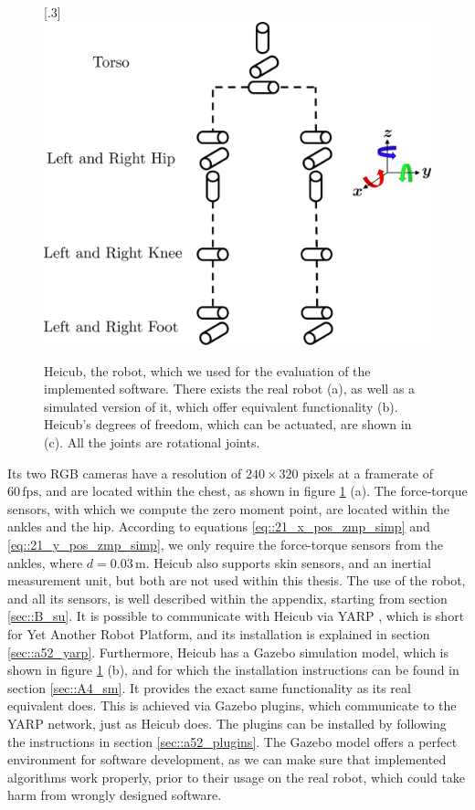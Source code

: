 \begin{figure}[h!]
	[.3\linewidth]{\includegraphics[scale=.35]{chapters/05_heicub_our_humanoid_robot/img/kinematic_tree.png}}
	\caption{Heicub, the robot, which we used for the evaluation of the implemented software. There exists the real robot (a), as well as a simulated version of it, which offer equivalent functionality (b). Heicub's degrees of freedom, which can be actuated, are shown in (c). All the joints are rotational joints.}
	\label{fig::4_hei}
\end{figure}
Its two RGB cameras have a resolution of $240\times320$ pixels at a framerate of $60\,\text{fps}$, and are located within the chest, as shown in figure \ref{fig::4_hei} (a). The force-torque sensors, with which we compute the zero moment point, are located within the ankles and the hip. According to equations \ref{eq::21_x_pos_zmp_simp} and \ref{eq::21_y_pos_zmp_simp}, we only require the force-torque sensors from the ankles, where $d=0.03\,\text{m}$. Heicub also supports skin sensors, and an inertial measurement unit, but both are not used within this thesis. The use of the robot, and all its sensors, is well described within the appendix, starting from section \ref{sec::B_su}. It is possible to communicate with Heicub via YARP \cite{metta2006yarp}, which is short for Yet Another Robot Platform, and its installation is explained in section \ref{sec::a52_yarp}. Furthermore, Heicub has a Gazebo \cite{koenig2004design} simulation model, which is shown in figure \ref{fig::4_hei} (b), and for which the installation instructions can be found in section \ref{sec::A4_sm}. It provides the exact same functionality as its real equivalent does. This is achieved via Gazebo plugins, which communicate to the YARP network, just as Heicub does. The plugins can be installed by following the instructions in section \ref{sec::a52_plugins}. The Gazebo model offers a perfect environment for software development, as we can make sure that implemented algorithms work properly, prior to their usage on the real robot, which could take harm from wrongly designed software.